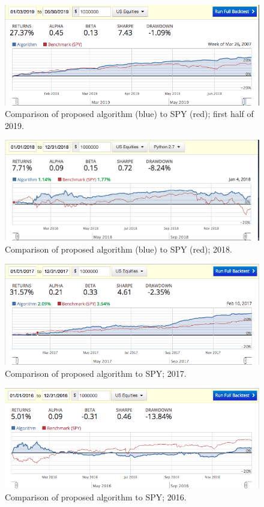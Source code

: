 \documentclass{article}
\begin{document}
\begin{figure}
\includegraphics[scale=0.5,bb=0 0 640 480]{figures/2019_half_mfd_macd.png}
\caption{Comparison of proposed algorithm (blue) to SPY (red); first
  half of 2019.}
\label{fig:backtest-2019-half}
\end{figure}

\begin{figure}
\includegraphics[scale=0.5,bb=0 0 640 480]{figures/mad_mfd_macd_2018.png}
\caption{Comparison of proposed algorithm (blue) to SPY (red); 2018.}
\label{fig:backtest-2018}
\end{figure}

\begin{figure}
\includegraphics[scale=0.5,bb=0 0 640 480]{figures/mad_mfd_macd_2017.png}
\caption{Comparison of proposed algorithm to SPY; 2017.}
\label{fig:backtest-2017}
\end{figure}

\begin{figure}
\includegraphics[scale=0.5,bb=0 0 640 480]{figures/mad_mfd_macd_2016.png}
\caption{Comparison of proposed algorithm to SPY; 2016.}
\label{fig:backtest-2016}
\end{figure}
\end{document}

